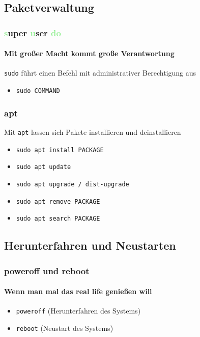 \documentclass[12pt,utf8]{beamer}
\begin{document}
\subsection{Paketverwaltung}
\begin{frame}
	\frametitle{\textcolor{lightGreen}{s}uper \textcolor{lightGreen}{u}ser \textcolor{lightGreen}{do}}
	\framesubtitle{Mit großer Macht kommt große Verantwortung}
	\texttt{sudo} führt einen Befehl mit administrativer Berechtigung aus
	\begin{itemize}
		\item \texttt{sudo COMMAND}
	\end{itemize}
\end{frame}

\begin{frame}
	\frametitle{apt}
	Mit \texttt{apt} lassen sich Pakete installieren und deinstallieren
	\begin{itemize}
		\item \texttt{sudo apt install PACKAGE}
		\item \texttt{sudo apt update}
		\item \texttt{sudo apt upgrade / dist-upgrade}
		\item \texttt{sudo apt remove PACKAGE}
		\item \texttt{sudo apt search PACKAGE}
	\end{itemize}
\end{frame}

\subsection{Herunterfahren und Neustarten}
\begin{frame}
\frametitle{poweroff und reboot}
\framesubtitle{Wenn man mal das real life genießen will}
\begin{itemize}
	\item \texttt{poweroff} (Herunterfahren des Systems)
	\item \texttt{reboot} (Neustart des Systems)
\end{itemize}
\end{frame}
\end{document}
